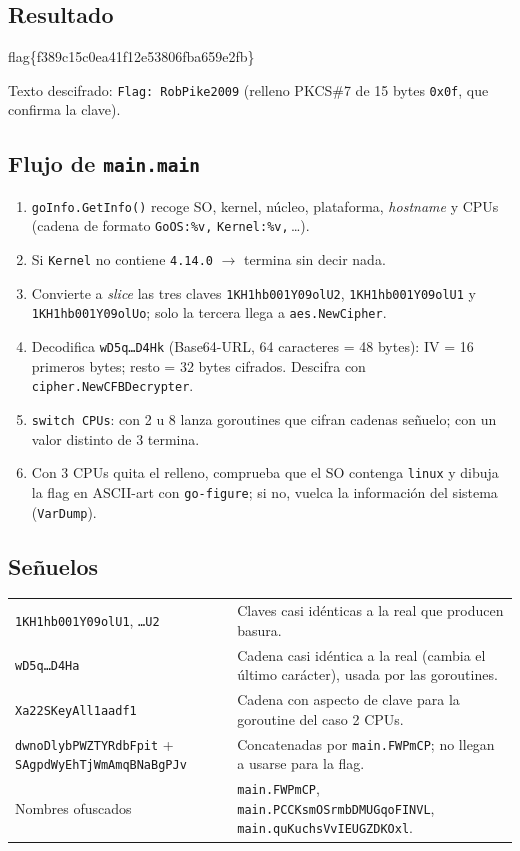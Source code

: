 \documentclass[11pt,a4paper]{article}
\newcommand{\flagbox}[2]{\begin{tcolorbox}[enhanced, colback=flagbg, colframe=green!45!black, boxrule=0.8pt, arc=3pt,
  fonttitle=\bfseries, title={#1}, halign=center]{\Large\ttfamily #2}\end{tcolorbox}}
\begin{document}
\subsection{Resultado}
\flagbox{Flag de Go go go!}{flag\{f389c15c0ea41f12e53806fba659e2fb\}}
Texto descifrado: \texttt{Flag: RobPike2009} (relleno PKCS\#7 de 15 bytes \texttt{0x0f}, que confirma la clave).

\subsection{Flujo de \texttt{main.main}}
\begin{enumerate}
  \item \texttt{goInfo.GetInfo()} recoge SO, kernel, núcleo, plataforma, \emph{hostname} y CPUs
        (cadena de formato \texttt{GoOS:\%v,} \texttt{Kernel:\%v,}\,\dots).
  \item Si \texttt{Kernel} no contiene \texttt{4.14.0} $\to$ termina sin decir nada.
  \item Convierte a \emph{slice} las tres claves \texttt{1KH1hb001Y09olU2}, \texttt{1KH1hb001Y09olU1} y
        \texttt{1KH1hb001Y09olUo}; solo la tercera llega a \texttt{aes.NewCipher}.
  \item Decodifica \texttt{wD5q\dots D4Hk} (Base64-URL, 64 caracteres = 48 bytes): IV = 16 primeros bytes; resto =
        32 bytes cifrados. Descifra con \texttt{cipher.NewCFBDecrypter}.
  \item \texttt{switch CPUs}: con 2 u 8 lanza goroutines que cifran cadenas señuelo; con un valor distinto de 3 termina.
  \item Con 3 CPUs quita el relleno, comprueba que el SO contenga \texttt{linux} y dibuja la flag en ASCII-art con
        \texttt{go-figure}; si no, vuelca la información del sistema (\texttt{VarDump}).
\end{enumerate}

\subsection{Señuelos}
\begin{tabularx}{\linewidth}{@{}lX@{}}
\toprule
\texttt{1KH1hb001Y09olU1}, \texttt{\dots U2} & Claves casi idénticas a la real que producen basura. \\
\texttt{wD5q\dots D4Ha} & Cadena casi idéntica a la real (cambia el último carácter), usada por las goroutines. \\
\texttt{Xa22SKeyAll1aadf1} & Cadena con aspecto de clave para la goroutine del caso 2 CPUs. \\
\texttt{dwnoDlybPWZTYRdbFpit} + \texttt{SAgpdWyEhTjWmAmqBNaBgPJv} & Concatenadas por \texttt{main.FWPmCP}; no llegan a usarse para la flag. \\
Nombres ofuscados & \texttt{main.FWPmCP}, \texttt{main.PCCKsmOSrmbDMUGqoFINVL}, \texttt{main.quKuchsVvIEUGZDKOxl}. \\
\bottomrule
\end{tabularx}
\end{document}
